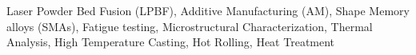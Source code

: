 

\begin{cvparagraph}

\textcolor{russell}{Laser Powder Bed Fusion (LPBF), Additive Manufacturing (AM), Shape Memory alloys (SMAs), Fatigue testing, Microstructural Characterization, Thermal Analysis, High Temperature Casting, Hot Rolling, Heat Treatment}
\end{cvparagraph}